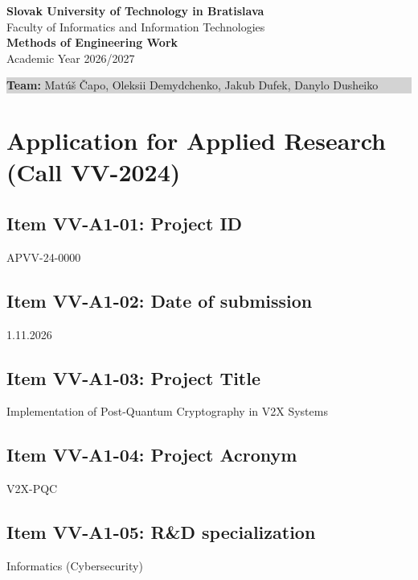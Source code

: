 \documentclass[11pt, a4paper]{article}
\begin{document}
\begin{center}
    {\Large \textbf{Slovak University of Technology in Bratislava}}\\[2pt]
    {\large Faculty of Informatics and Information Technologies}\\[15pt]
    {\LARGE \textbf{\color{primary} Methods of Engineering Work}}\\[4pt]
    {\large Academic Year 2026/2027}
\end{center}
\vspace{10pt}
\begin{center}
    \colorbox{lightgray}{%
        \parbox{0.95\textwidth}{%
            \vspace{4pt}
            \textbf{Team:} Matúš Čapo, Oleksii Demydchenko, Jakub Dufek, Danylo Dusheiko \hfill \\[2pt]
            \vspace{4pt}
        }
    }
\end{center}
\vspace{15pt}
\section*{Application for Applied Research (Call VV-2024)}
\vspace{10pt}
\subsection*{Item VV-A1-01: Project ID}
APVV-24-0000
\vspace{15pt}
\subsection*{Item VV-A1-02: Date of submission}
1.11.2026
\vspace{15pt}
\subsection*{Item VV-A1-03: Project Title}
Implementation of Post-Quantum Cryptography in V2X Systems
\vspace{15pt}
\subsection*{Item VV-A1-04: Project Acronym}
V2X-PQC
\vspace{15pt}
\subsection*{Item VV-A1-05: R\&D specialization}
Informatics (Cybersecurity)
\vspace{15pt}
\end{document}
